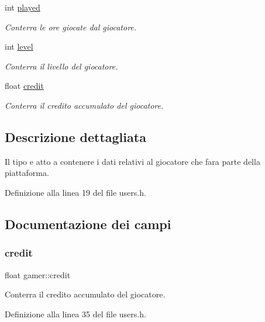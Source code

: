 \begin{DoxyCompactItemize}
int \hyperlink{structgamer_a61d06d292744f84b81e6f2491948d931}{played}
\begin{DoxyCompactList}\small\item\em Conterra\textquotesingle{} le ore giocate dal giocatore. \end{DoxyCompactList}\item 
int \hyperlink{structgamer_a611b73d05bac2a5a2ee6b4de489e18bb}{level}
\begin{DoxyCompactList}\small\item\em Conterra\textquotesingle{} il livello del giocatore. \end{DoxyCompactList}\item 
float \hyperlink{structgamer_addda65dfc0a61d7f0f70911f97a9d8f2}{credit}
\begin{DoxyCompactList}\small\item\em Conterra\textquotesingle{} il credito accumulato del giocatore. \end{DoxyCompactList}\end{DoxyCompactItemize}


\subsection{Descrizione dettagliata}
Il tipo e\textquotesingle{} atto a contenere i dati relativi al giocatore che fara\textquotesingle{} parte della piattaforma. 

Definizione alla linea 19 del file users.\+h.



\subsection{Documentazione dei campi}
\mbox{\label{structgamer_addda65dfc0a61d7f0f70911f97a9d8f2}} 
\subsubsection{\texorpdfstring{credit}{credit}}
{\footnotesize\ttfamily float gamer\+::credit}



Conterra\textquotesingle{} il credito accumulato del giocatore. 



Definizione alla linea 35 del file users.\+h.



